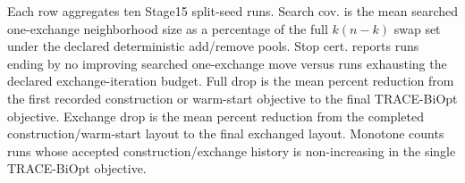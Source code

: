 \begin{table}[pos=htbp]
\centering
\caption{TRACE-BiOpt optimization diagnostics from Stage15 histories, including searched one-exchange coverage and stop certificates.}
\label{tab:trace-biopt-optimization}
\tiny
{}
\begin{flushleft}\footnotesize Each row aggregates ten Stage15 split-seed runs. Search cov. is the mean searched one-exchange neighborhood size as a percentage of the full $k(n-k)$ swap set under the declared deterministic add/remove pools. Stop cert. reports runs ending by no improving searched one-exchange move versus runs exhausting the declared exchange-iteration budget. Full drop is the mean percent reduction from the first recorded construction or warm-start objective to the final TRACE-BiOpt objective. Exchange drop is the mean percent reduction from the completed construction/warm-start layout to the final exchanged layout. Monotone counts runs whose accepted construction/exchange history is non-increasing in the single TRACE-BiOpt objective.\end{flushleft}
\end{table}
